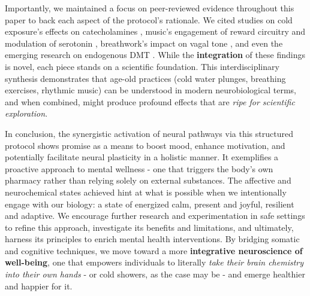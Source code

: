 \documentclass[11pt]{article}
\begin{document}
Importantly, we maintained a focus on peer-reviewed evidence throughout this paper to back each aspect of the protocol's rationale. We cited studies on cold exposure's effects on catecholamines \cite{Sramek2000}, music's engagement of reward circuitry \cite{Feduccia2008} and modulation of serotonin \cite{Sramek2000}, breathwork's impact on vagal tone \cite{LABORDE2022104711}, and even the emerging research on endogenous DMT \cite{Dean2019}. While the \textbf{integration} of these findings is novel, each piece stands on a scientific foundation. This interdisciplinary synthesis demonstrates that age-old practices (cold water plunges, breathing exercises, rhythmic music) can be understood in modern neurobiological terms, and when combined, might produce profound effects that are \textit{ripe for scientific exploration}.

In conclusion, the synergistic activation of neural pathways via this structured protocol shows promise as a means to boost mood, enhance motivation, and potentially facilitate neural plasticity in a holistic manner. It exemplifies a proactive approach to mental wellness - one that triggers the body's own pharmacy rather than relying solely on external substances. The affective and neurochemical states achieved hint at what is possible when we intentionally engage with our biology: a state of energized calm, present and joyful, resilient and adaptive. We encourage further research and experimentation in safe settings to refine this approach, investigate its benefits and limitations, and ultimately, harness its principles to enrich mental health interventions. By bridging somatic and cognitive techniques, we move toward a more \textbf{integrative neuroscience of well-being}, one that empowers individuals to literally \textit{take their brain chemistry into their own hands} - or cold showers, as the case may be - and emerge healthier and happier for it.

\medskip

\printbibliography[title={References}]
\end{document}
